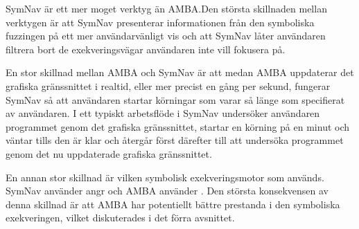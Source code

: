 SymNav är ett mer moget verktyg än AMBA.\@ Den största skillnaden mellan verktygen
är att SymNav presenterar informationen från den symboliska fuzzingen på ett mer
användarvänligt vis och att SymNav låter användaren filtrera bort de
exekveringsvägar användaren inte vill fokusera på.

En stor skillnad mellan AMBA och SymNav är att medan AMBA uppdaterar det
grafiska gränssnittet i realtid, eller mer precist en gång per sekund, fungerar
SymNav så att användaren startar körningar som varar så länge som specifierat av
användaren. I ett typiskt arbetsflöde i SymNav undersöker användaren programmet
genom det grafiska gränssnittet, startar en körning på en minut och väntar tills
den är klar och återgår först därefter till att undersöka programmet genom det
nu uppdaterade grafiska gränssnittet.

En annan stor skillnad är vilken symbolisk exekveringsmotor som används. SymNav
använder angr och AMBA använder \stoe{}. Den största konsekvensen av denna
skillnad är att AMBA har potentiellt bättre prestanda i den symboliska
exekveringen, vilket diskuterades i det förra avsnittet.
